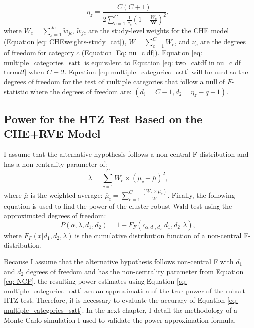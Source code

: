 \begin{equation}
    \label{eq: multiple_categories_satt}
    \eta_z = \frac{C(C+1)}{2\sum_{c=1}^C \frac{1}{\nu_c}\left(1 - \frac{W_c}{\mathbf{W} } \right)^2},
\end{equation}
where $W_c = \sum_{j=1}^{Jc} \tilde{w}_{jc}$, $\tilde{w}_{jc}$ are the study-level weights for the CHE model (Equation \ref{eq: CHEweights-study_cat}), $W = \sum_{c=1}^C W_c$, and $\nu_c$ are the degrees of freedom for category $c$ (Equation \ref{Eq: nu_c df}). Equation \ref{eq: multiple_categories_satt} is equivalent to Equation \ref{eq: two_catdf in nu_c df terms2} when $C=2$. Equation \ref{eq: multiple_categories_satt} will be used as the degrees of freedom for the test of multiple categories that follow a null of $F$-statistic where the degrees of freedom are:  $(d_1 = C-1, d_2 = \eta_z - q +1)$. 






\subsection{Power for the HTZ Test Based on the CHE+RVE Model} \label{sec: power_multiple}

I assume that the alternative hypothesis follows a non-central F-distribution and has a non-centrality parameter of: 
\begin{equation} \label{eq: NCP}
    \lambda = \sum_{c=1}^C W_c \times (\mu_c - \overline{\mu})^2,
\end{equation}
where $\overline{\mu}$ is the weighted average: $\overline{\mu}_c = \sum_{c=1}^C \frac{(W_c \times \mu_c)}{W}$. Finally, the following equation is used to find the power of the  cluster-robust Wald test using the approximated degrees of freedom:
\begin{equation} \label{eq: power F}
    P(\alpha, \lambda, d_1, d_2) = 1 - F_F(c_{\alpha, d_1, d_2 }| d_1, d_2, \lambda),
\end{equation}
where $F_F(x| d_1, d_2, \lambda)$ is the cumulative distribution function of a non-central F-distribution.

Because I assume that the alternative hypothesis follows non-central F with $d_1$ and $d_2$ degrees of freedom and has the non-centrality parameter from Equation \ref{eq: NCP}, the resulting power estimates using Equation \ref{eq: multiple_categories_satt} are an approximation of the true power of the robust HTZ test. Therefore, it is necessary to evaluate the accuracy of Equation \ref{eq: multiple_categories_satt}. In the next chapter, I detail the methodology of a Monte Carlo simulation I used to validate the power approximation formula.  


